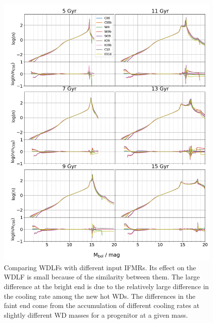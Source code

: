 \documentclass[fleqn,usenatbib]{rasti}
\begin{document}
\begin{figure}
    \centering
    \includegraphics[width=\textwidth]{wdlf_compare_ifmr.png}
    \caption{Comparing WDLFs with different input IFMRs. Its effect on the WDLF
    is small because of the similarity between them. The large difference at
    the bright end is due to the relatively large difference in the cooling
    rate among the new hot WDs. The differences in the faint end come from the
    accumulation of different cooling rates at slightly different WD masses for
    a progenitor at a given mass.}
    \label{fig:wdlf_compare_ifmr}
\end{figure}
\end{document}
